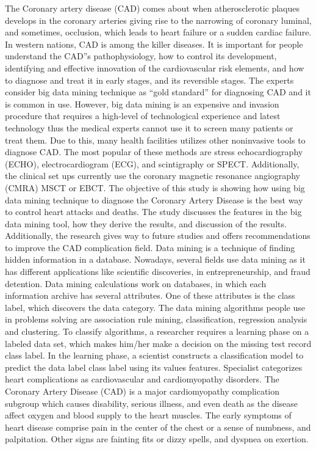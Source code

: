 \documentclass[sigconf]{acmart}
\begin{document}
The Coronary artery disease (CAD) comes about when atherosclerotic plaques develops in the coronary arteries giving rise to the narrowing of coronary luminal, and sometimes, occlusion, which leads to heart failure or a sudden cardiac failure. In western nations, CAD is among the killer  diseases. It is important for people understand the CAD”s pathophysiology, how to control its development, identifying and effective innovation of the cardiovascular risk elements, and how to diagnose and treat it in early stages, and its reversible stages. The experts consider big data mining technique as “gold standard” for diagnosing CAD and it is common in use. However, big data mining is an expensive and invasion procedure that requires a high-level of technological experience and latest technology thus the medical experts cannot use it to screen many patients or treat them.  Due to this, many health facilities utilizes other noninvasive tools to diagnose CAD. The most popular of these methods are stress echocardiography (ECHO), electrocardiogram (ECG), and scintigraphy or SPECT. Additionally, the clinical set ups currently use the coronary magnetic resonance angiography (CMRA) MSCT or EBCT. The objective of this study is showing how using big data mining technique to diagnose the Coronary Artery Disease is the best way to control heart attacks and deaths. The study discusses the features in the big data mining tool, how they derive the results, and discussion of the results. Additionally, the research gives way to future studies and offers recommendations to improve the CAD complication field. 
Data mining is a technique of finding hidden information in a database. Nowadays, several fields use data mining as it has different applications like scientific discoveries, in entrepreneurship, and fraud detention. Data mining calculations work on databases, in which each information archive has several attributes.  One of these attributes is the class label, which discovers the data category. The data mining algorithms people use in problems solving are association rule mining, classification, regression analysis and clustering.
To classify algorithms, a researcher requires a learning phase on a labeled data set, which makes him/her make a decision on the missing test record class label. In the learning phase, a scientist constructs a classification model to predict the data label class label using its values features. Specialist categorizes heart complications as cardiovascular and cardiomyopathy disorders. The Coronary Artery Disease (CAD) is a major cardiomyopathy complication subgroup which causes disability, serious illness, and even death as the disease affect oxygen and blood supply to the heart muscles. The early symptoms of heart disease comprise pain in the center of the chest or a sense of numbness, and palpitation. Other signs are fainting fits or dizzy spells, and dyspnea on exertion. 
\end{document}
